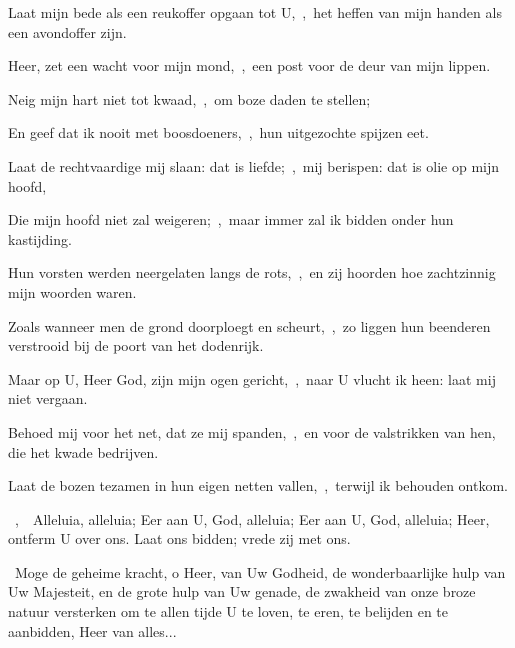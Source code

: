 \documentclass[12pt,twoside,a5paper]{article}
\begin{document}
\begin{halfparskip}
  Laat mijn bede als een reukoffer opgaan tot U,~\sep\ het heffen van mijn handen als een avondoffer zijn.

  Heer, zet een wacht voor mijn mond,~\sep\ een post voor de deur van mijn lippen.

  Neig mijn hart niet tot kwaad,~\sep\ om boze daden te stellen;

  En geef dat ik nooit met boosdoeners,~\sep\ hun uitgezochte spijzen eet.

  Laat de rechtvaardige mij slaan: dat is liefde;~\sep\ mij berispen: dat is olie op mijn hoofd,

  Die mijn hoofd niet zal weigeren;~\sep\ maar immer zal ik bidden onder hun kastijding.

  Hun vorsten werden neergelaten langs de rots,~\sep\ en zij hoorden hoe zachtzinnig mijn woorden waren.

  Zoals wanneer men de grond doorploegt en scheurt,~\sep\ zo liggen hun beenderen verstrooid bij de poort van het dodenrijk.

  Maar op U, Heer God, zijn mijn ogen gericht,~\sep\ naar U vlucht ik heen: laat mij niet vergaan.

  Behoed mij voor het net, dat ze mij spanden,~\sep\ en voor de valstrikken van hen, die het kwade bedrijven.

  Laat de bozen tezamen in hun eigen netten vallen,~\sep\ terwijl ik behouden ontkom.
\end{halfparskip}

\begin{halfparskip}
  ~\sep\ \dd~Alleluia, alleluia; Eer aan U, God, alleluia; Eer aan U, God, alleluia; Heer, ontferm U over ons. Laat ons bidden; vrede zij met ons.

  \cc~Moge de geheime kracht, o Heer, van Uw Godheid, de wonderbaarlijke hulp van Uw Majesteit, en de grote hulp van Uw genade, de zwakheid van onze broze natuur versterken om te allen tijde U te loven, te eren, te belijden en te aanbidden, Heer van alles...
\end{halfparskip}


\end{document}
